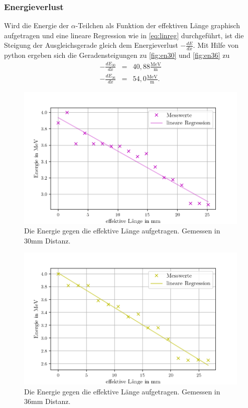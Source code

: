 \subsubsection*{Energieverlust}
Wird die Energie der $\alpha$-Teilchen als Funktion der effektiven Länge 
graphisch aufgetragen und eine lineare Regression wie in \autoref{eq:linreg} durchgeführt,
ist die Steigung der Ausgleichsgerade gleich dem Energieverlust $-\frac{dE}{dx}$.
Mit Hilfe von python ergeben sich die Geradensteigungen zu \autoref{fig:en30} und \autoref{fig:en36} zu
\begin{eqnarray}
 - \frac{dE_{30}}{dx} &=& 40,88 \mathrm{\frac{MeV}{m}} \nonumber  \\
 - \frac{dE_{36}}{dx} &=& 54,0 \mathrm{\frac{MeV}{m}}. \nonumber  
\end{eqnarray}

\begin{figure}[H]
  \centering
  \includegraphics[width = \textwidth]{content/energie30mm.png}
  \caption{Die Energie gegen die effektive Länge aufgetragen. Gemessen in 30mm Distanz.}
  \label{fig:en30}
\end{figure}
\begin{figure}[H]
  \centering
  \includegraphics[width = \textwidth]{content/energie36mm.png}
  \caption{Die Energie gegen die effektive Länge aufgetragen. Gemessen in 36mm Distanz.}
  \label{fig:en36}
\end{figure}


